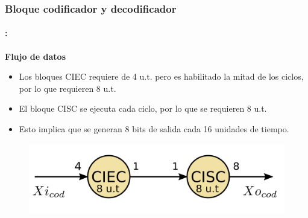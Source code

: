 \begin{frame}
  \frametitle{\textbf{\textbf{Bloque codificador y decodificador}}}
          \framesubtitle{\secname : \subsecname}
    \begin{block}{\centering \textbf{Flujo de datos}}
     \begin{itemize}
        \item Los bloques CIEC requiere de 4 u.t. pero es habilitado la mitad de los ciclos, por lo que requieren 8 u.t.
        \item El bloque CISC se ejecuta cada ciclo, por lo que se requieren 8 u.t.
        \item Esto implica que se generan 8 bits de salida cada 16 unidades de tiempo.
    \end{itemize}
    \end{block}
    \vspace{-0.3cm}
  \begin{figure}[!t] \centering
  \includegraphics[width=0.70\paperwidth]{Diagramas/grafo_cod.png}%
  \end{figure}
\end{frame}


